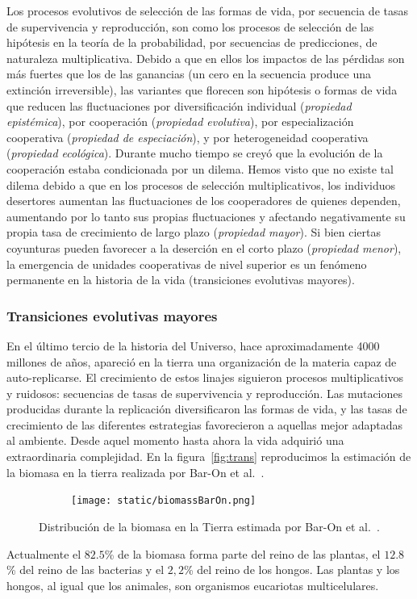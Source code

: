 \documentclass[a4paper,11pt]{book}
\theoremstyle{definition}
\begin{document}
Los procesos evolutivos de selecci\'on de las formas de vida, por secuencia de tasas de supervivencia y reproducci\'on, son como los procesos de selecci\'on de las hip\'otesis en la teor\'ia de la probabilidad, por secuencias de predicciones, de naturaleza multiplicativa.
%
Debido a que en ellos los impactos de las p\'erdidas son m\'as fuertes que los de las ganancias (un cero en la secuencia produce una extinci\'on irreversible), las variantes que florecen son hip\'otesis o formas de vida que reducen las fluctuaciones por diversificaci\'on individual (\emph{propiedad epist\'emica}), por cooperaci\'on (\emph{propiedad evolutiva}), por especializaci\'on cooperativa (\emph{propiedad de especiaci\'on}), y por heterogeneidad cooperativa (\emph{propiedad ecol\'ogica}).
%
Durante mucho tiempo se crey\'o que la evoluci\'on de la cooperaci\'on estaba condicionada por un dilema.
%
Hemos visto que no existe tal dilema debido a que en los procesos de selecci\'on multiplicativos, los individuos desertores aumentan las fluctuaciones de los cooperadores de quienes dependen, aumentando por lo tanto sus propias fluctuaciones y afectando negativamente su propia tasa de crecimiento de largo plazo (\emph{propiedad mayor}).
%
Si bien ciertas coyunturas pueden favorecer a la deserci\'on en el corto plazo (\emph{propiedad menor}), la emergencia de unidades cooperativas de nivel superior es un fen\'omeno permanente en la historia de la vida (transiciones evolutivas mayores).


\subsubsection{Transiciones evolutivas mayores}

En el \'ultimo tercio de la historia del Universo, hace aproximadamente 4000 millones de a\~nos, apareci\'o en la tierra una organizaci\'on de la materia capaz de auto-replicarse.
%
El crecimiento de estos linajes siguieron procesos multiplicativos y ruidosos: secuencias de tasas de supervivencia y reproducci\'on.
%
Las mutaciones producidas durante la replicaci\'on diversificaron las formas de vida, y las tasas de crecimiento de las diferentes estrategias favorecieron a aquellas mejor adaptadas al ambiente.
%
Desde aquel momento hasta ahora la vida adquiri\'o una extraordinaria complejidad.
%
En la figura~\ref{fig:trans} reproducimos la estimaci\'on de la biomasa en la tierra realizada por Bar-On et al.~\cite{barOn2018-biomass}.
%
\begin{figure}[ht!]
    \centering
    \begin{subfigure}[b]{0.65\textwidth}
    \texttt{[image: static/biomassBarOn.png]}
    \end{subfigure}
    \caption{
	Distribuci\'on de la biomasa en la Tierra estimada por Bar-On et al.~\cite{barOn2018-biomass}.
    }
    \label{fig:biomass}
\end{figure}
%
Actualmente el $82.5$\% de la biomasa forma parte del reino de las plantas, el $12.8$\% del reino de las bacterias y el $2,2$\% del reino de los hongos.
%
Las plantas y los hongos, al igual que los animales, son organismos eucariotas multicelulares.
\end{document}
